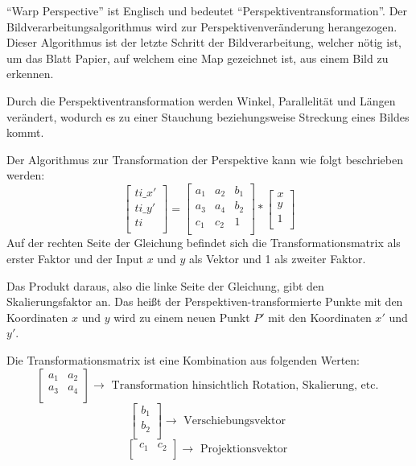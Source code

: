 ``Warp Perspective'' ist Englisch und bedeutet ``Perspektiventransformation''. Der Bildverarbeitungsalgorithmus wird zur Perspektivenveränderung herangezogen. Dieser Algorithmus ist der letzte Schritt der Bildverarbeitung, welcher nötig ist, um das Blatt Papier, auf welchem eine Map gezeichnet ist, aus einem Bild zu erkennen.

Durch die Perspektiventransformation werden Winkel, Parallelität und Längen verändert, wodurch es zu einer Stauchung beziehungsweise Streckung eines Bildes kommt.

Der Algorithmus zur Transformation der Perspektive kann wie folgt beschrieben werden:
\[
    \left[\begin{array}{r}
            ti\_x' \\
            ti\_y' \\
            ti     \\
        \end{array}\right]
    = \left[\begin{array}{rrr}
            a_{ 1 } & a_{ 2 } & b_{ 1 } \\
            a_{ 3 } & a_{ 4 } & b_{ 2 } \\
            c_{ 1 } & c_{ 2 } & 1       \\
        \end{array}\right]
    * \left[\begin{array}{r}
            x \\
            y \\
            1 \\
        \end{array}\right]
\]
Auf der rechten Seite der Gleichung befindet sich die Transformationsmatrix als erster Faktor und der Input \(x\) und \(y\) als Vektor und 1 als zweiter Faktor.

Das Produkt daraus, also die linke Seite der Gleichung, gibt den Skalierungsfaktor an. Das heißt der Perspektiven-transformierte Punkte mit den Koordinaten \(x\) und \(y\) wird zu einem neuen Punkt \(P'\) mit den Koordinaten \(x'\) und \(y'\).

Die Transformationsmatrix ist eine Kombination aus folgenden Werten:
\[
    \left[\begin{array}{rr}
            a_{ 1 } & a_{ 2 } \\
            a_{ 3 } & a_{ 4 } \\
        \end{array}
        \right]
    \to
    \text{ Transformation hinsichtlich Rotation, Skalierung, etc. }
\]
\[
    \left[\begin{array}{r}
            b_{ 1 } \\
            b_{ 2 } \\
        \end{array}
        \right]
    \to
    \text{ Verschiebungsvektor }
\]
\[
    \left[\begin{array}{rr}
            c_{ 1 } & c_{ 2 } \\
        \end{array}
        \right]
    \to
    \text{ Projektionsvektor }
\]

